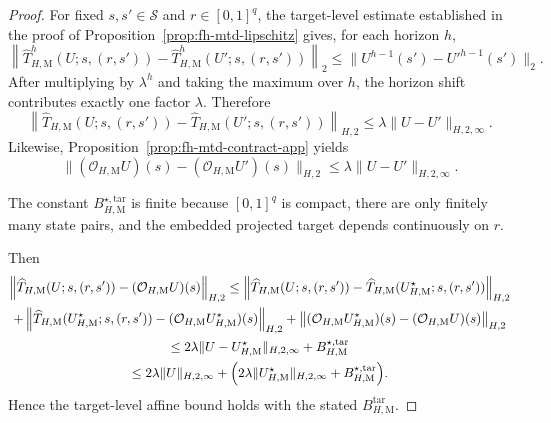 \documentclass{article}
\newcommand{\X}{\mathcal{S}}
\begin{document}
\begin{proof}
For fixed $s,s' \in \X$ and $r \in [0,1]^q$, the target-level estimate established in the proof of Proposition~\ref{prop:fh-mtd-lipschitz} gives, for each horizon $h$,
\begin{equation}
\left\lVert \widehat T_{H,\mathrm M}^h(U; s, (r,s')) - \widehat T_{H,\mathrm M}^h(U'; s, (r,s')) \right\rVert_2 \le \lVert U^{h-1}(s')-{U'}^{h-1}(s') \rVert_2.
\end{equation}
After multiplying by $\lambda^h$ and taking the maximum over $h$, the horizon shift contributes exactly one factor $\lambda$. Therefore
\begin{equation}
\left\lVert \widehat T_{H,\mathrm M}(U; s, (r,s')) - \widehat T_{H,\mathrm M}(U'; s, (r,s')) \right\rVert_{H,2} \le \lambda \lVert U-U' \rVert_{H,2,\infty}.
\end{equation}
Likewise, Proposition~\ref{prop:fh-mtd-contract-app} yields
\begin{equation}
\lVert (\mathcal O_{H,\mathrm M}U)(s) - (\mathcal O_{H,\mathrm M}U')(s) \rVert_{H,2} \le \lambda \lVert U-U' \rVert_{H,2,\infty}.
\end{equation}

The constant $B^{\star,\mathrm{tar}}_{H,\mathrm M}$ is finite because $[0,1]^q$ is compact, there are only finitely many state pairs, and the embedded projected target depends continuously on $r$.

Then
\begin{equation}
\begin{gathered}
\left\lVert \widehat T_{H,\mathrm M}(U; s, (r,s')) - (\mathcal O_{H,\mathrm M}U)(s) \right\rVert_{H,2} \le \left\lVert \widehat T_{H,\mathrm M}(U; s, (r,s')) - \widehat T_{H,\mathrm M}(U^\star_{H,\mathrm M}; s, (r,s')) \right\rVert_{H,2} \\ 
+ \left\lVert \widehat T_{H,\mathrm M}(U^\star_{H,\mathrm M}; s, (r,s')) - (\mathcal O_{H,\mathrm M}U^\star_{H,\mathrm M})(s) \right\rVert_{H,2} + \left\lVert (\mathcal O_{H,\mathrm M}U^\star_{H,\mathrm M})(s) - (\mathcal O_{H,\mathrm M}U)(s) \right\rVert_{H,2} \\ 
\le 2 \lambda \lVert U-U^\star_{H,\mathrm M} \rVert_{H,2,\infty} + B^{\star,\mathrm{tar}}_{H,\mathrm M} \\
\le 2 \lambda \lVert U \rVert_{H,2,\infty} + \Bigl( 2 \lambda \lVert U^\star_{H,\mathrm M} \rVert_{H,2,\infty} + B^{\star,\mathrm{tar}}_{H,\mathrm M} \Bigr).
\end{gathered}
\end{equation}
Hence the target-level affine bound holds with the stated $B^{\mathrm{tar}}_{H,\mathrm M}$.


\end{proof}
\end{document}
